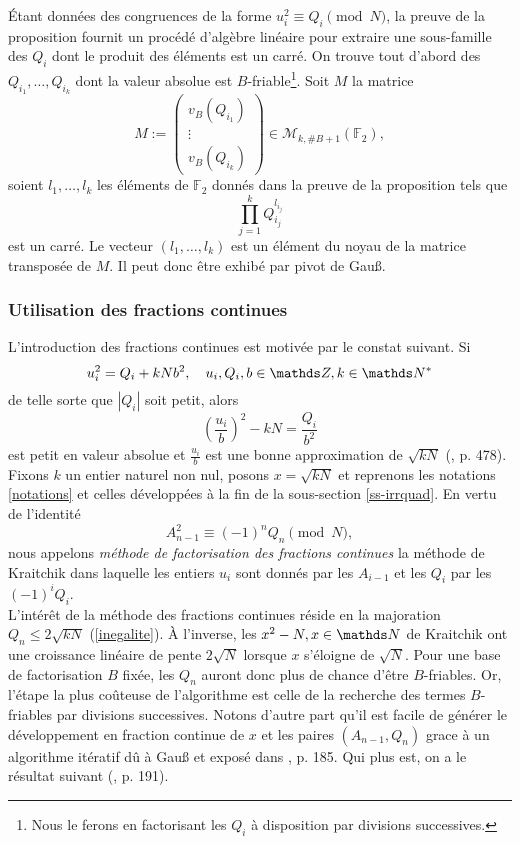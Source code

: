\label{matrice-gauss}
Étant données des congruences de la forme $u_i^2 \equiv Q_i \pmod{N}$, la
preuve de la proposition fournit un procédé d'algèbre linéaire pour extraire
une sous-famille des $Q_i$ dont le produit des éléments est un carré. On trouve
tout d'abord des $Q_{i_1}, \dots, Q_{i_k}$ dont la valeur absolue est
$B$-friable\footnote{Nous le ferons en factorisant les $Q_i$ à disposition par
divisions successives.}. Soit $M$ la matrice \[M := \begin{pmatrix}
v_B(Q_{i_1}) \\ \vdots \\ v_B(Q_{i_k})\end{pmatrix}\in \mathcal{M}_{k,
\#B+1}(\mathbb{F}_2),\] soient $l_{1}, \dots, l_{k}$ les éléments de
$\mathbb{F}_2$ donnés dans la preuve de la proposition tels que \[\prod_{j=1}^k
Q_{i_j}^{l_{i_j}}\] est un carré. Le vecteur $(l_1, \dots, l_{k})$ est un
élément du noyau de la matrice transposée de $M$. Il peut donc être exhibé 
par pivot de Gau\ss{}.

\subsubsection{Utilisation des fractions continues}

L'introduction des fractions continues est motivée par le constat suivant. Si
\[u_i^2 = Q_i + kNb^2, \quad u_i, Q_i, b\in \Z, k\in \N^*\] de telle sorte que
$| Q_i |$ soit petit, alors \[\left(\frac{u_i}{b}\right)^2 - kN =
\frac{Q_i}{b^2}\] est petit en valeur absolue et $\frac{u_i}{b}$ est une bonne
approximation de $\sqrt{kN}$ (\cite{Cohen}, p. 478). Fixons $k$ un entier
naturel non nul, posons $x = \sqrt{kN}$ et reprenons les notations
\ref{notations} et celles développées à la fin de la sous-section
\ref{ss-irrquad}. En vertu de l'identité \[A_{n-1}^2 \equiv (-1)^n Q_n
\pmod{N},\] nous appelons \emph{méthode de factorisation des fractions
continues} la méthode de Kraitchik dans laquelle les entiers $u_i$ sont donnés
par les $A_{i-1}$ et les $Q_i$ par les $(-1)^i Q_i$. \\

L'intérêt de la méthode des fractions continues réside en la majoration $Q_n
\leq 2\sqrt{kN}$ (\ref{inegalite}). À l'inverse, les $x^2 - N, x\in \N$ de
Kraitchik ont une croissance linéaire de pente $2\sqrt{N}$ lorsque $x$
s'éloigne de $\sqrt{N}$. Pour une base de factorisation $B$ fixée, les $Q_n$
auront donc plus de chance d'être $B$-friables. Or, l'étape la plus coûteuse de
l'algorithme est celle de la recherche des termes $B$-friables par divisions
successives. Notons d'autre part qu'il est facile de générer le développement
en fraction continue de $x$ et les paires $(A_{n-1}, Q_n)$ grace à un
algorithme itératif dû à Gau\ss{} et exposé dans \cite{MB}, p. 185. Qui plus
est, on a le résultat suivant (\cite{MB}, p. 191).

